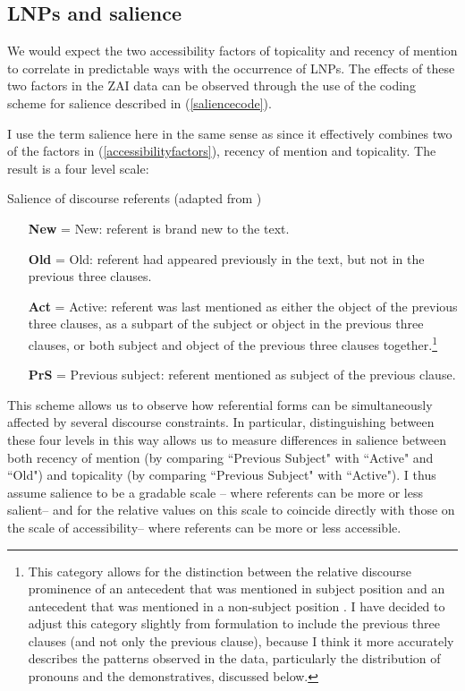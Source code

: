 \subsection{LNPs and salience}\label{coding}

We would expect the two accessibility factors of topicality and recency of mention to correlate in predictable ways with the occurrence of LNPs. The effects of these two factors in the ZAI data can be observed through the use of the coding scheme for salience described in (\ref{saliencecode}). 

I use the term salience here in the same sense as \citet{arnold2003} since it effectively combines two of the factors in (\ref{accessibilityfactors}), recency of mention and topicality. The result is a four level scale:


\ea\label{saliencecode}  Salience of discourse referents (adapted from \citet[231]{arnold2003})

\begin{itemize}
\item[\textbf{New}] = New: referent is brand new to the text.

\item[\textbf{Old}] = Old: referent had appeared previously in the text, but not in the previous three clauses.

\item[\textbf{Act}] = Active: referent was last mentioned as either the object of the previous three clauses, as a subpart of the subject or object in the previous three clauses, or both subject and object of the previous three clauses together.\footnote{This category allows for the distinction between the relative discourse prominence of an antecedent that was mentioned in subject position and an antecedent that was mentioned in a non-subject position \citep[226]{arnold2003}. I have decided to adjust this category slightly from \citet[231]{arnold2003} formulation to include the previous three clauses (and not only the previous clause), because I think it more accurately describes the patterns observed in the data, particularly the distribution of pronouns and the demonstratives, discussed below.}

\item[\textbf{PrS}] = Previous subject: referent mentioned as subject of the previous clause.
\end{itemize}

\z
This scheme allows us to observe how referential forms can be simultaneously affected by several discourse constraints. In particular, distinguishing between these four levels in this way allows us to measure differences in salience between both recency of mention (by comparing ``Previous Subject" with ``Active" and ``Old") and topicality (by comparing ``Previous Subject" with ``Active"). I thus assume salience to be a gradable scale \citep{hopper1980}-- where referents can be more or less salient-- and for the relative values on this scale to coincide directly with those on the scale of accessibility-- where referents can be more or less accessible. 

